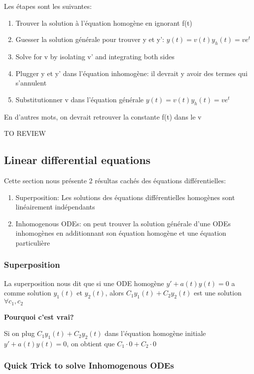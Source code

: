 \documentclass{article}
\begin{document}
Les étapes sont les suivantes:
\begin{enumerate}
    \item Trouver la solution à l'équation homogène en ignorant f(t)
    \item Guesser la solution générale pour trouver
	y et y': $ y(t) = v(t) y_h (t) = v e^t $
    \item Solve for v by isolating v' and integrating both sides
    \item Plugger y et y' dans l'équation inhomogène: il devrait y avoir des
	termes qui s'annulent
    \item Substitutionner v dans l'équation générale
	$ y(t) = v(t) y_h (t) = v e^t $
\end{enumerate}

En d'autres mots, on devrait retrouver la constante f(t) dans le v

TO REVIEW

\subsection{Linear differential equations}

Cette section nous présente 2 résultas cachés des équations différentielles:
\begin{enumerate}
    \item Superposition: Les solutions des équations différentielles homogènes
	sont linéairement indépendants
    \item Inhomogenous ODEs: on peut trouver la solution générale d'une
	ODEs inhomogènes en additionnant son équation homogène et une
	équation particulière
\end{enumerate}

\subsubsection{Superposition}

La superposition nous dit que si une ODE homogène $y'+a(t)y(t) = 0$ a comme
solution $y_1(t)$ et $y_2(t)$, alors $ C_1 y_1(t) + C_2 y_2(t) $ est une
solution $ \forall c_1, c_2$

\textbf{Pourquoi c'est vrai?}

Si on plug $ C_1 y_1(t) + C_2 y_2(t) $ dans l'équation homogène initiale
$y'+a(t)y(t) = 0$, on obtient que $ C_1 \cdot 0 + C_2 \cdot 0$

\subsubsection{Quick Trick to solve Inhomogenous ODEs}
\end{document}
